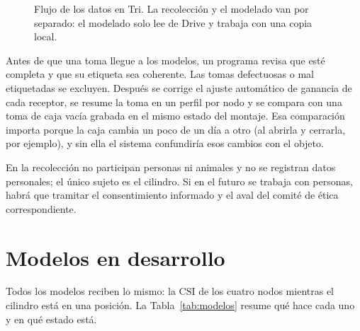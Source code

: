 \documentclass[10pt,journal]{IEEEtran}
\begin{document}
\begin{figure}[!t]
\centering
{}
\caption{Flujo de los datos en Tri. La recolección y el modelado van por separado: el modelado solo lee de Drive y trabaja con una copia local.}
\label{fig:flujo}
\end{figure}

Antes de que una toma llegue a los modelos, un programa revisa que esté completa y que su etiqueta sea coherente. Las tomas defectuosas o mal etiquetadas se excluyen. Después se corrige el ajuste automático de ganancia de cada receptor, se resume la toma en un perfil por nodo y se compara con una toma de caja vacía grabada en el mismo estado del montaje. Esa comparación importa porque la caja cambia un poco de un día a otro (al abrirla y cerrarla, por ejemplo), y sin ella el sistema confundiría esos cambios con el objeto.

En la recolección no participan personas ni animales y no se registran datos personales; el único sujeto es el cilindro. Si en el futuro se trabaja con personas, habrá que tramitar el consentimiento informado y el aval del comité de ética correspondiente.

\section{Modelos en desarrollo}\label{sec:modelos}
Todos los modelos reciben lo mismo: la CSI de los cuatro nodos mientras el cilindro está en una posición. La Tabla~\ref{tab:modelos} resume qué hace cada uno y en qué estado está.
\end{document}
